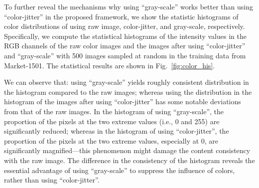 \documentclass[journal]{IEEEtran}
\def\ie{i.e.}
\begin{document}
\begin{table}
\small
{}

\end{table}


To further reveal the mechanisms why using ``gray-scale'' works better than using ``color-jitter'' in the proposed framework, we show the statistic histograms of color distributions of using raw image, color-jitter, and gray-scale, respectively. 
Specifically, we compute the statistical histograms of the intensity values in the RGB channels of the raw color images and the images after using ``color-jitter'' and ``gray-scale'' with 500 images sampled at random in the training data from Market-1501. The statistical results are shown in Fig.~\ref{fig:color_his}. 






We can observe that: using ``gray-scale'' yields roughly consistent distribution in the histogram compared to the raw images; whereas using the distribution in the histogram of the images after using ``color-jitter'' has some notable deviations from that of the raw images. In the histogram of using ``gray-scale'', the proportion of the pixels at the two extreme values (\ie, 0 and 255) are significantly reduced; whereas in the histogram of using ``color-jitter'', the proportion of the pixels at the two extreme values, especially at 0, are significantly magnified---this phenomenon might damage the content consistency with the raw image. The difference in the consistency of the histogram reveals the essential advantage of using ``gray-scale'' to suppress the influence of colors, rather than using ``color-jitter''. 
\end{document}
